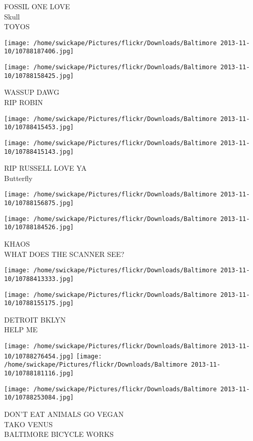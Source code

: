 \documentclass[10pt,letterpaper]{article}
\begin{document}
FOSSIL ONE LOVE\\
Skull\\
TOYOS
\pagebreak

\texttt{[image: /home/swickape/Pictures/flickr/Downloads/Baltimore 2013-11-10/10788187406.jpg]}

\vspace{0.25in}
\texttt{[image: /home/swickape/Pictures/flickr/Downloads/Baltimore 2013-11-10/10788158425.jpg]}

WASSUP DAWG\\
RIP ROBIN
\pagebreak

\texttt{[image: /home/swickape/Pictures/flickr/Downloads/Baltimore 2013-11-10/10788415453.jpg]}

\vspace{0.25in}
\texttt{[image: /home/swickape/Pictures/flickr/Downloads/Baltimore 2013-11-10/10788415143.jpg]}

RIP RUSSELL LOVE YA\\
Butterfly
\pagebreak

\texttt{[image: /home/swickape/Pictures/flickr/Downloads/Baltimore 2013-11-10/10788156875.jpg]}

\vspace{0.25in}
\texttt{[image: /home/swickape/Pictures/flickr/Downloads/Baltimore 2013-11-10/10788184526.jpg]}

KHAOS\\
WHAT DOES THE SCANNER SEE?
\pagebreak

\texttt{[image: /home/swickape/Pictures/flickr/Downloads/Baltimore 2013-11-10/10788413333.jpg]}

\vspace{0.25in}
\texttt{[image: /home/swickape/Pictures/flickr/Downloads/Baltimore 2013-11-10/10788155175.jpg]}

DETROIT BKLYN\\
HELP ME
\pagebreak

\texttt{[image: /home/swickape/Pictures/flickr/Downloads/Baltimore 2013-11-10/10788276454.jpg]}
\texttt{[image: /home/swickape/Pictures/flickr/Downloads/Baltimore 2013-11-10/10788181116.jpg]}

\texttt{[image: /home/swickape/Pictures/flickr/Downloads/Baltimore 2013-11-10/10788253084.jpg]}

DON'T EAT ANIMALS GO VEGAN\\
TAKO VENUS\\
BALTIMORE BICYCLE WORKS
\pagebreak
\end{document}

